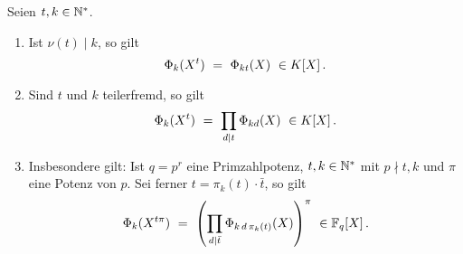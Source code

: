 \begin{satz}
  \label{satz:zusammenhang_unterschiedlicher_kreisteilungspolys}
  Seien $t,k \in \mathbb{N}^\ast$.
  \begin{enumerate}
    \item Ist $\nu(t) \mid k$, so gilt
      \[ \Phi_k(X^t) \speq= \Phi_{kt}(X) \ \in K[X]\,.\]
    \item Sind $t$ und $k$ teilerfremd, so gilt
      \[ \Phi_k(X^t) \ =\  \prod_{d\mid t} \Phi_{kd}(X)\ \in K[X]\,.\]
    \item Insbesondere gilt: Ist $q = p^r$ eine Primzahlpotenz,
      $t,k\in\mathbb{N}^\ast$ mit $p\nmid t,k$ und $\pi$ eine Potenz von $p$. Sei ferner
      $t = \pi_k(t)\cdot \bar t$, so gilt
      \[ \Phi_k(X^{t\pi}) \ =\  
        \left(\prod_{d\mid \bar t} \Phi_{k\,d\,\pi_k(t)} (X)\right)^\pi
        \ \in \mathbb{F}_q[X]\,. \]
  \end{enumerate}
\end{satz}
